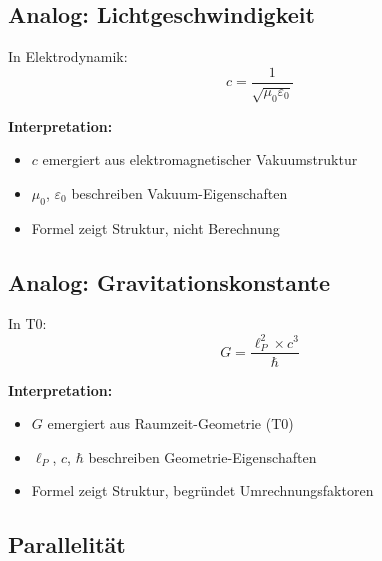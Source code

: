 	\subsection{Analog: Lichtgeschwindigkeit}
	
	In Elektrodynamik:
	\begin{equation}
		c = \frac{1}{\sqrt{\mu_0 \varepsilon_0}}
	\end{equation}
	
	\textbf{Interpretation:}
	\begin{itemize}
		\item $c$ emergiert aus elektromagnetischer Vakuumstruktur
		\item $\mu_0$, $\varepsilon_0$ beschreiben Vakuum-Eigenschaften
		\item Formel zeigt Struktur, nicht Berechnung
	\end{itemize}
	
	\subsection{Analog: Gravitationskonstante}
	
	In T0:
	\begin{equation}
		G = \frac{\ell_P^2 \times c^3}{\hbar}
	\end{equation}
	
	\textbf{Interpretation:}
	\begin{itemize}
		\item $G$ emergiert aus Raumzeit-Geometrie (T0)
		\item $\ell_P$, $c$, $\hbar$ beschreiben Geometrie-Eigenschaften
		\item Formel zeigt Struktur, begründet Umrechnungsfaktoren
	\end{itemize}
	
	\subsection{Parallelität}
	
	\begin{table}[h]
		\centering
		\caption{Parallele Strukturen}
	\end{table}
	
